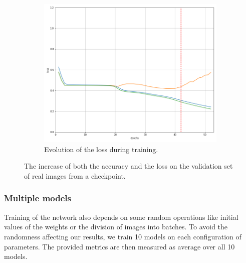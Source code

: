 \begin{figure}[!h]
\begin{subfigure}[t]{.45\textwidth}
        \includegraphics[width=\textwidth]{images/losses1ss_0.png}
        \caption{Evolution of the loss during training.}
        \label{fig:loss1}
    \end{subfigure}

    \caption{The increase of both the accuracy and the loss on the validation set of real images from a checkpoint.}
    \label{fig:esalossacc1}
\end{figure}


\subsubsection{Multiple models}

Training of the network also depends on some random operations like initial values of the weights or the division of images into batches. To avoid the randomness affecting our results, we train 10 models on each configuration of parameters. The provided metrics are then measured as average over all 10 models. 
